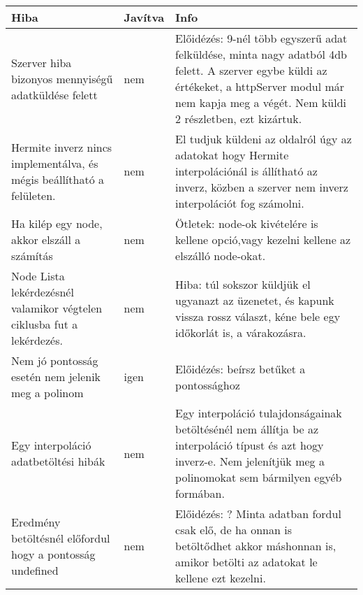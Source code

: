 	\begin{center}
  	\begin{tabular}{| p{4cm} | p{1.5cm} | p{8cm} |}
    \hline
    Hiba & Javítva & Info
    \\ \hline
    	Szerver hiba bizonyos mennyiségű adatküldése felett 
      &
    	nem
      &  
    	Előidézés: 9-nél több egyszerű adat felküldése, minta nagy adatból 4db felett.
    	A szerver egybe küldi az értékeket, a httpServer modul már nem kapja meg a végét. Nem küldi 2 részletben, ezt kizártuk.
    \\ \hline
    	Hermite inverz nincs implementálva, és mégis beállítható a felületen.  
      &
      	nem
      &
		El tudjuk küldeni az oldalról úgy az adatokat hogy Hermite interpolációnál is állítható az inverz, közben a szerver nem inverz interpolációt fog számolni.
    \\ \hline
        Ha kilép egy node, akkor elszáll a számítás 
      &
      	nem
      &
		Ötletek: node-ok kivételére is kellene opció,vagy kezelni kellene az elszálló node-okat.
    \\ \hline
        Node Lista lekérdezésnél valamikor végtelen ciklusba fut a lekérdezés. 
      &
      	nem
      &
		Hiba: túl sokszor küldjük el ugyanazt az üzenetet, és kapunk vissza rossz választ, kéne bele egy időkorlát is, a várakozásra. 
	\\ \hline
        Nem jó pontosság esetén nem jelenik meg a polinom
      &
      	igen
      &
		Előidézés: beírsz betűket a pontossághoz 
    \\ \hline
        Egy interpoláció adatbetöltési hibák
      &
      	nem
      &
      	Egy interpoláció tulajdonságainak betöltésénél nem állítja be az interpoláció típust és azt hogy inverz-e.
      	Nem jelenítjük meg a polinomokat sem bármilyen egyéb formában.
    \\ \hline
        Eredmény betöltésnél előfordul hogy a pontosság undefined 
      &
      	nem
      &
		Előidézés: ? Minta adatban fordul csak elő, de ha onnan  is betöltődhet akkor máshonnan is, amikor betölti az adatokat le kellene ezt kezelni.
    \\ \hline
  	\end{tabular}
	\end{center}